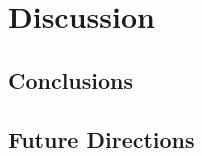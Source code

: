 \documentclass{report}
\begin{document}
\chapter{Discussion}

\section{Conclusions}

\section{Future Directions}



\end{document}
